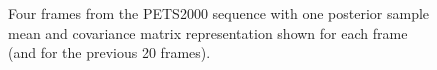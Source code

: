 \documentclass[smallcondensed, final]{svjour3}
\begin{document}
\begin{figure}[h]
  \centering             
   \hspace{1pt}
   \hspace{1pt}
   \hspace{1pt}
  \caption{Four frames from the PETS2000 sequence with one posterior sample mean and covariance matrix representation shown for each frame (and for the previous 20 frames).}
  \label{fig:pets2001_imgs}
\end{figure}
\end{document}
